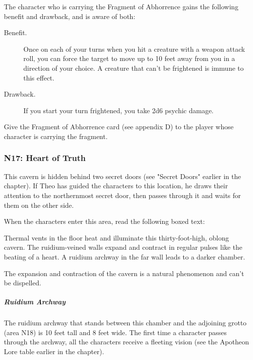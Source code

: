 \documentclass[10pt,a4paper,twoside,bg=print,twocolumn,openany,nodeprecatedcode]{dndbook}
\begin{document}
The character who is carrying the Fragment of Abhorrence gains the following benefit and drawback, and is aware of both:

\begin{DndSidebar}[float=!b]{}

\begin{description}
\item[Benefit.]
Once on each of your turns when you hit a creature with a weapon attack roll, you can force the target to move up to 10 feet away from you in a direction of your choice. A creature that can't be frightened is immune to this effect.
\item[Drawback.]
If you start your turn frightened, you take 2d6 psychic damage.
\end{description}



\end{DndSidebar}

Give the Fragment of Abhorrence card (see appendix D) to the player whose character is carrying the fragment.

\subsubsection{N17: Heart of Truth}
This cavern is hidden behind two secret doors (see "Secret Doors" earlier in the chapter). If Theo has guided the characters to this location, he draws their attention to the northernmost secret door, then passes through it and waits for them on the other side.

When the characters enter this area, read the following boxed text:

\begin{DndReadAloud}{}
Thermal vents in the floor heat and illuminate this thirty-foot-high, oblong cavern. The ruidium-veined walls expand and contract in regular pulses like the beating of a heart. A ruidium archway in the far wall leads to a darker chamber.

\end{DndReadAloud}

The expansion and contraction of the cavern is a natural phenomenon and can't be dispelled.

\subparagraph{Ruidium Archway}
The ruidium archway that stands between this chamber and the adjoining grotto (area N18) is 10 feet tall and 8 feet wide. The first time a character passes through the archway, all the characters receive a fleeting vision (see the Apotheon Lore table earlier in the chapter).
\end{document}
